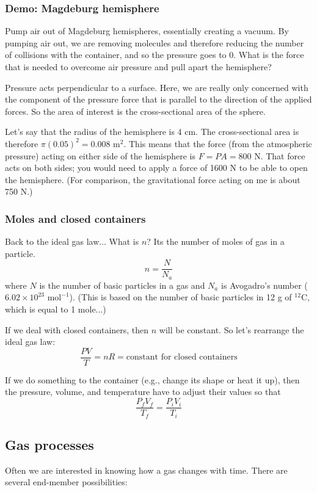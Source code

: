 \subsubsection{Demo: Magdeburg hemisphere}
Pump air out of Magdeburg hemispheres, essentially creating a vacuum. By pumping air out, we are removing molecules and therefore reducing the number of collisions with the container, and so the pressure goes to 0. What is the force that is needed to overcome air pressure and pull apart the hemisphere?

Pressure acts perpendicular to a surface. Here, we are really only concerned with the component of the pressure force that is parallel to the direction of the applied forces. So the area of interest is the cross-sectional area of the sphere.

Let's say that the radius of the hemisphere is 4 cm. The cross-sectional area is therefore $\pi(0.05)^2=0.008\mbox{ m}^2$. This means that the force (from the atmospheric pressure) acting on either side of the hemisphere is $F=PA=800\mbox{ N}$. That force acts on both sides; you would need to apply a force of 1600 N to be able to open the hemisphere. (For comparison, the gravitational force acting on me is about 750 N.)

\subsubsection{Moles and closed containers}
Back to the ideal gas law... What is $n$? Its the number of moles of gas in a particle.
$$n=\frac{N}{N_a}$$
where $N$ is the number of basic particles in a gas and $N_a$ is Avogadro's number ($6.02\times 10^{23}\mbox{ mol}^{-1}$). (This is based on the number of basic particles in 12 g of $^{12}$C, which is equal to 1 mole...)

If we deal with closed containers, then $n$ will be constant. So let's rearrange the ideal gas law:
$$\frac{PV}{T}=nR=\mbox{constant for closed containers}$$

If we do something to the container (e.g., change its shape or heat it up), then the pressure, volume, and temperature have to adjust their values so that
$$\frac{P_fV_f}{T_f}=\frac{P_iV_i}{T_i}$$


\subsection{Gas processes}
Often we are interested in knowing how a gas changes with time. There are several end-member possibilities:

